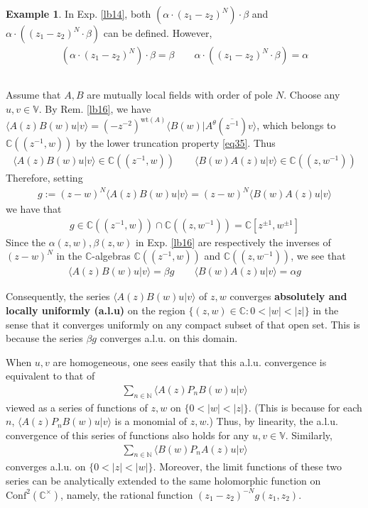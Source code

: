 \documentclass[12pt,b5paper,notitlepage]{article}
\theoremstyle{definition}
\newtheorem{eg}[df]{Example}
\theoremstyle{plain}
\newcommand{\ovl}{\overline}
\newcommand{\Conf}{\mathrm{Conf}}
\newcommand{\bk}[1]{\langle {#1}\rangle}
\newcommand{\Vbb}{\mathbb V}
\newcommand{\Cbb}{\mathbb C}
\newcommand{\Nbb}{\mathbb N}
\newcommand{\wt}{\mathrm{wt}}
\numberwithin{equation}{section}
\begin{document}
\begin{eg}\label{lb15}
In Exp. \ref{lb14}, both  $(\alpha\cdot (z_1-z_2)^N)\cdot \beta$ and $\alpha\cdot ((z_1-z_2)^N\cdot\beta)$ can be defined. However,
\begin{gather*}
(\alpha\cdot (z_1-z_2)^N)\cdot \beta=\beta\qquad \alpha\cdot ((z_1-z_2)^N\cdot \beta)=\alpha
\end{gather*}
\end{eg}




\subsection{}\label{lb23}

Assume that $A,B$ are mutually local fields with order of pole $N$. Choose any $u,v\in\Vbb$. By Rem. \ref{lb16}, we have $\bk{A(z)B(w)u|v}=(-z^{-2})^{\wt(A)}\bk{B(w)|A^\theta(\ovl{z^{-1}})v}$, which belongs to $\Cbb((z^{-1},w))$ by the lower truncation property \eqref{eq35}. Thus
\begin{align*}
\bk{A(z)B(w)u|v}\in \Cbb((z^{-1},w))\qquad\bk{B(w)A(z)u|v}\in\Cbb((z,w^{-1}))
\end{align*}
Therefore, setting
\begin{align*}
g:=(z-w)^N\bk{A(z)B(w)u|v}=(z-w)^N\bk{B(w)A(z)u|v}
\end{align*}
we have that
\begin{align*}
g\in\Cbb((z^{-1},w))\cap\Cbb((z,w^{-1}))=\Cbb[z^{\pm1},w^{\pm1}]
\end{align*}
Since the $\alpha(z,w),\beta(z,w)$ in Exp. \ref{lb16} are respectively the inverses of $(z-w)^N$ in the $\Cbb$-algebras $\Cbb((z^{-1},w))$ and $\Cbb((z,w^{-1}))$, we see that
\begin{align*}
\bk{A(z)B(w)u|v}=\beta g\qquad \bk{B(w)A(z)u|v}=\alpha g
\end{align*}


Consequently, the series $\bk{A(z)B(w)u|v}$ of $z,w$ converges \textbf{absolutely and locally uniformly (a.l.u)}  on the region $\{(z,w)\in\Cbb:0<|w|<|z|\}$ in the sense that it converges uniformly on any compact subset of that open set. This is because the series $\beta g$ converges a.l.u. on this domain. 

When $u,v$ are homogeneous, one sees easily that this a.l.u. convergence is equivalent to that of 
\begin{align*}
\sum_{n\in\Nbb}\bk{A(z)P_nB(w)u|v}
\end{align*}
viewed as a series of functions of $z,w$ on $\{0<|w|<|z|\}$. (This is because for each $n$, $\bk{A(z)P_nB(w)u|v}$ is a monomial of $z,w$.) Thus, by linearity, the a.l.u. convergence of this series of functions also holds for any $u,v\in\Vbb$. Similarly,
\begin{align*}
\sum_{n\in\Nbb}\bk{B(w)P_nA(z)u|v}
\end{align*}
converges a.l.u. on $\{0<|z|<|w|\}$. Moreover, the limit functions of these two series can be analytically extended to the same holomorphic function on $\Conf^2(\Cbb^\times)$, namely, the rational function $(z_1-z_2)^{-N}g(z_1,z_2)$.
\end{document}
